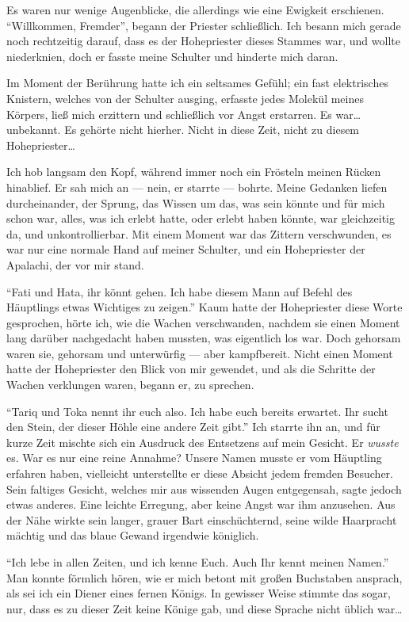 Es waren nur wenige Augenblicke, die allerdings wie eine Ewigkeit erschienen. 
\enquote{Willkommen, Fremder}, begann der Priester schließlich. Ich besann mich gerade noch rechtzeitig darauf, dass es der Hohepriester dieses Stammes war, und wollte niederknien, doch er fasste meine Schulter und hinderte mich daran.

Im Moment der Berührung hatte ich ein seltsames Gefühl; ein fast elektrisches Knistern, welches von der Schulter ausging, erfasste jedes Molekül meines Körpers, ließ mich erzittern und schließlich vor Angst erstarren. Es war\dots{} unbekannt. Es gehörte nicht hierher. Nicht in diese Zeit, nicht zu diesem Hohepriester\dots{}

Ich hob langsam den Kopf, während immer noch ein Frösteln meinen Rücken hinablief. Er sah mich an --- nein, er starrte --- bohrte. Meine Gedanken liefen durcheinander, der Sprung, das Wissen um das, was sein könnte und für mich schon war, alles, was ich erlebt hatte, oder erlebt haben könnte, war gleichzeitig da, und unkontrollierbar.
Mit einem Moment war das Zittern verschwunden, es war nur eine normale Hand auf meiner Schulter, und ein Hohepriester der Apalachi, der vor mir stand.

\enquote{Fati und Hata, ihr könnt gehen. Ich habe diesem Mann auf Befehl des Häuptlings etwas Wichtiges zu zeigen.} Kaum hatte der Hohepriester diese Worte gesprochen, hörte ich, wie die Wachen verschwanden, nachdem sie einen Moment lang darüber nachgedacht haben mussten, was eigentlich los war. Doch gehorsam waren sie, gehorsam und unterwürfig --- aber kampfbereit. 
Nicht einen Moment hatte der Hohepriester den Blick von mir gewendet, und als die Schritte der Wachen verklungen waren, begann er, zu sprechen.

\enquote{Tariq und Toka nennt ihr euch also. Ich habe euch bereits erwartet. Ihr sucht den Stein, der dieser Höhle eine andere Zeit gibt.}
Ich starrte ihn an, und für kurze Zeit mischte sich ein Ausdruck des Entsetzens auf mein Gesicht. Er \emph{wusste} es. War es nur eine reine Annahme? Unsere Namen musste er vom Häuptling erfahren haben, vielleicht unterstellte er diese Absicht jedem fremden Besucher. Sein faltiges Gesicht, welches mir aus wissenden Augen entgegensah, sagte jedoch etwas anderes. Eine leichte Erregung, aber keine Angst war ihm anzusehen. Aus der Nähe wirkte sein langer, grauer Bart einschüchternd, seine wilde Haarpracht mächtig und das blaue Gewand irgendwie königlich.

\enquote{Ich lebe in allen Zeiten, und ich kenne Euch. Auch Ihr kennt meinen Namen.} 
Man konnte förmlich hören, wie er mich betont mit großen Buchstaben ansprach, als sei ich ein Diener eines fernen Königs. In gewisser Weise stimmte das sogar, nur, dass es zu dieser Zeit keine Könige gab, und diese Sprache nicht üblich war\dots{}

